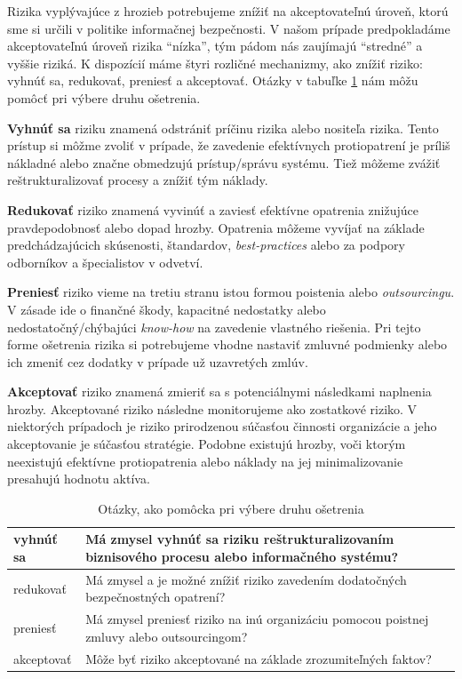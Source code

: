 Rizika vyplývajúce z hrozieb potrebujeme znížiť na akceptovateľnú úroveň, ktorú sme si určili v politike informačnej bezpečnosti. V našom prípade
predpokladáme akceptovateľnú úroveň rizika \enquote{nízka}, tým pádom nás zaujímajú \enquote{stredné} a vyššie riziká. K dispozícií máme štyri
rozličné mechanizmy, ako znížiť riziko: vyhnúť sa, redukovať, preniesť a akceptovať. Otázky v tabuľke \ref{tab:trmqst} nám môžu pomôcť pri výbere
druhu ošetrenia. 

\textbf{Vyhnúť sa} riziku znamená odstrániť príčinu rizika alebo nositeľa rizika. Tento prístup si môžme zvoliť v prípade, že zavedenie efektívnych
protiopatrení je príliš nákladné alebo značne obmedzujú prístup/správu systému. Tiež môžeme zvážiť reštrukturalizovať procesy a znížiť tým náklady.

\textbf{Redukovať} riziko znamená vyvinúť a zaviesť efektívne opatrenia znižujúce pravdepodobnosť alebo dopad hrozby. Opatrenia môžeme vyvíjať
na základe predchádzajúcich skúsenosti, štandardov, \emph{best-practices} alebo za podpory odborníkov a špecialistov v odvetví.

\textbf{Preniesť} riziko vieme na tretiu stranu istou formou poistenia alebo \emph{outsourcingu}. V zásade ide o finančné škody, kapacitné nedostatky
alebo nedostatočný/chýbajúci \emph{know-how} na zavedenie vlastného riešenia. Pri tejto forme ošetrenia rizika si potrebujeme vhodne nastaviť zmluvné
podmienky alebo ich zmeniť cez dodatky v prípade už uzavretých zmlúv.


\textbf{Akceptovať} riziko znamená zmieriť sa s potenciálnymi následkami naplnenia hrozby. Akceptované riziko následne monitorujeme ako zostatkové riziko.
V niektorých prípadoch je riziko prirodzenou súčasťou činnosti organizácie a jeho akceptovanie je súčasťou stratégie. Podobne existujú hrozby, voči ktorým
neexistujú efektívne protiopatrenia alebo náklady na jej minimalizovanie presahujú hodnotu aktíva.



\begin{table}[h!]
    \caption{Otázky, ako pomôcka pri výbere druhu ošetrenia}
    \label{tab:trmqst}
    \begin{center}
        \footnotesize
        \begin{tabularx}{\textwidth}{|l|X|}
        \hline
        vyhnúť sa & Má zmysel vyhnúť sa riziku reštrukturalizovaním biznisového procesu alebo informačného systému?
        \\
        \hline
        redukovať & Má zmysel a je možné znížiť riziko zavedením dodatočných bezpečnostných opatrení?
        \\
        \hline
        preniesť & Má zmysel preniesť riziko na inú organizáciu pomocou poistnej zmluvy alebo outsourcingom?
        \\
        \hline
        akceptovať & Môže byť riziko akceptované na základe zrozumiteľných faktov?
        \\
        \hline
        \end{tabularx}
    \end{center}
\end{table}

